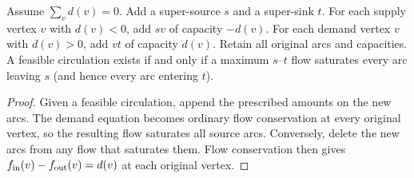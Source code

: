 \begin{noteapplication}
Assume $\sum_v d(v)=0$.  Add a super-source $s$ and a super-sink $t$.
For each supply vertex $v$ with $d(v)<0$, add $sv$ of capacity $-d(v)$.
For each demand vertex $v$ with $d(v)>0$, add $vt$ of capacity $d(v)$.
Retain all original arcs and capacities.  A feasible circulation exists if
and only if a maximum $s$--$t$ flow saturates every arc leaving $s$ (and hence
every arc entering $t$).
\end{noteapplication}
\begin{proof}
Given a feasible circulation, append the prescribed amounts on the new arcs.
The demand equation becomes ordinary flow conservation at every original
vertex, so the resulting flow saturates all source arcs.  Conversely, delete
the new arcs from any flow that saturates them.  Flow conservation then gives
$f_{\operatorname{in}}(v)-f_{\operatorname{out}}(v)=d(v)$ at each original vertex.
\end{proof}
